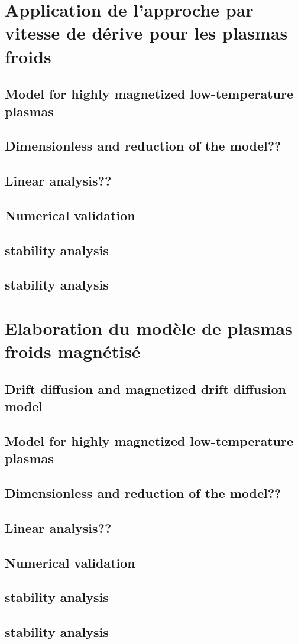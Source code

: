 	\section{Application de l'approche par vitesse de dérive pour les plasmas froids}
		\subsection{Model for highly magnetized low-temperature plasmas}
		\subsection{Dimensionless and reduction of the model??}
		\subsection{Linear analysis??}
		\subsection{Numerical validation}
		\subsection{stability analysis}
		\subsection{stability analysis}
	\section{Elaboration du modèle de plasmas froids magnétisé}
		\subsection{Drift diffusion and magnetized drift diffusion model}
		\subsection{Model for highly magnetized low-temperature plasmas}
		\subsection{Dimensionless and reduction of the model??}
		\subsection{Linear analysis??}
		\subsection{Numerical validation}
		\subsection{stability analysis}
		\subsection{stability analysis}
